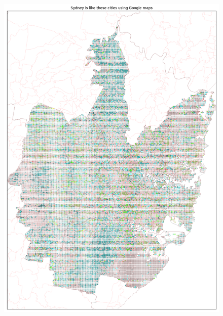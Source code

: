 \documentclass[sageh,times]{sagej}
\begin{document}
\begin{figure}[!htbp]
\centering    
\includegraphics[scale=0.20]{Images/SydneyOverall_maps.png} 

\end{figure}
\end{document}
